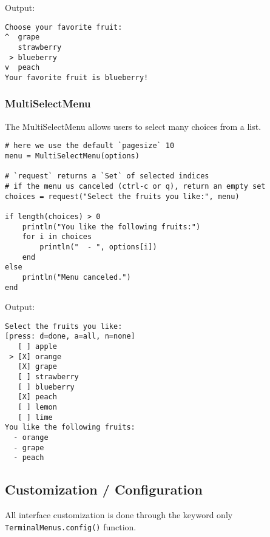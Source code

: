 Output:




\begin{lstlisting}
Choose your favorite fruit:
^  grape
   strawberry
 > blueberry
v  peach
Your favorite fruit is blueberry!
\end{lstlisting}



\hypertarget{6295927836435212296}{}


\subsubsection{MultiSelectMenu}



The MultiSelectMenu allows users to select many choices from a list.




\begin{verbatim}
# here we use the default `pagesize` 10
menu = MultiSelectMenu(options)

# `request` returns a `Set` of selected indices
# if the menu us canceled (ctrl-c or q), return an empty set
choices = request("Select the fruits you like:", menu)

if length(choices) > 0
    println("You like the following fruits:")
    for i in choices
        println("  - ", options[i])
    end
else
    println("Menu canceled.")
end
\end{verbatim}



Output:




\begin{lstlisting}
Select the fruits you like:
[press: d=done, a=all, n=none]
   [ ] apple
 > [X] orange
   [X] grape
   [ ] strawberry
   [ ] blueberry
   [X] peach
   [ ] lemon
   [ ] lime
You like the following fruits:
  - orange
  - grape
  - peach
\end{lstlisting}



\hypertarget{664736390801158626}{}


\subsection{Customization / Configuration}



All interface customization is done through the keyword only \texttt{TerminalMenus.config()} function.




